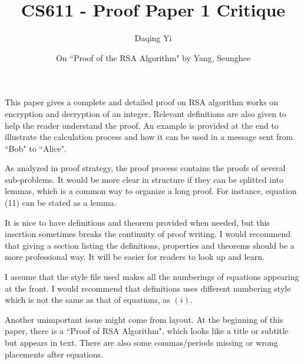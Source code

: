 \documentclass[12pt]{article}
\begin{document}
\title{\textsf{CS611 - Proof Paper 1 Critique}}
\author{\textsf{Daqing Yi}}
\date{\textsf{On ``Proof of the RSA Algorithm" by Yang, Seunghee}}

\maketitle


This paper gives a complete and detailed proof on RSA algorithm works on encryption and decryption of an integer. Relevant definitions are also given to help the reader understand the proof. An example is provided at the end to illustrate the calculation process and how it can be used in a message sent from ``Bob" to ``Alice". 

As analyzed in proof strategy, the proof process contains the proofs of several sub-problems. It would be more clear in structure if they can be splitted into lemmas, which is a common way to organize a long proof. For instance, equation (11) can be stated as a lemma.

It is nice to have definitions and theorem provided when needed, but this insertion sometimes breaks the continuity of proof writing. I would recommend that giving a section listing the definitions, properties and theorems should be a more professional way. It will be easier for readers to look up and learn. 

I assume that the style file used makes all the numberings of equations appearing at the front. I would recommend that definitions uses different numbering style which is not the same as that of equations, as $ (i) $.


Another unimportant issue might come from layout. At the beginning of this paper, there is a ``Proof of RSA Algorithm", which looks like a title or subtitle but appears in text. There are also some commas/periods missing or wrong placements after equations. 
\end{document}
